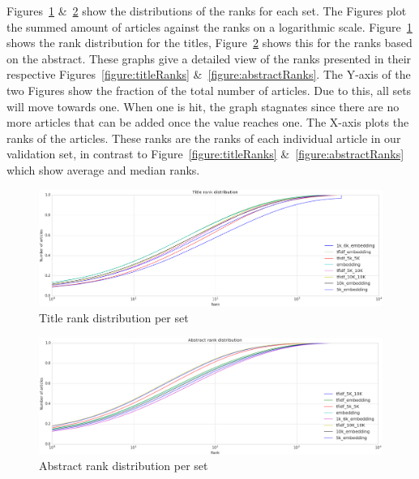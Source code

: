 \documentclass[../../Thesis.tex]{subfiles}
\begin{document}
Figures~\ref{figure:titleDistribution} \&~\ref{figure:abstractDistribution} show the distributions of the ranks for each set. The Figures plot the summed amount of articles against the ranks on a logarithmic scale. Figure~\ref{figure:titleDistribution} shows the rank distribution for the titles, Figure~\ref{figure:abstractDistribution} shows this for the ranks based on the abstract. These graphs give a detailed view of the ranks presented in their respective Figures~\ref{figure:titleRanks} \&~\ref{figure:abstractRanks}. The Y-axis of the two Figures show the fraction of the total number of articles. Due to this, all sets will move towards one. When one is hit, the graph stagnates since there are no more articles that can be added once the value reaches one. The X-axis plots the ranks of the articles. These ranks are the ranks of each individual article in our validation set, in contrast to Figure~\ref{figure:titleRanks} \&~\ref{figure:abstractRanks} which show average and median ranks.
\begin{figure}[hbt]
\includegraphics[width=6.5in]{Plots/Title_rank_distribution}
\caption{Title rank distribution per set}\label{figure:titleDistribution}
\end{figure}
\begin{figure}[hbt]
\includegraphics[width=6.5in]{Plots/Abstract_rank_distribution}
\caption{Abstract rank distribution per set}\label{figure:abstractDistribution}
\end{figure}
\end{document}
